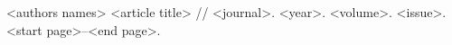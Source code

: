 \begin{thebibliography}{10}
	
	<authors names>
	<article title>
	//
	<journal>.
	<year>.
	<volume>.
	<issue>.
	<start page>--<end page>.
	
\end{thebibliography}